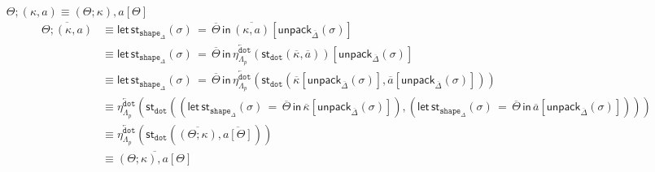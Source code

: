\documentclass[10pt]{article}
\theoremstyle{definition}
\newcommand{\rewrite}[2]{\overleftarrow{#1}(#2)}
\newcommand\StI[2]{\ensuremath{\mathsf{st}_{#1}(#2)}}
\newcommand\StE[4]{\ensuremath{\mathsf{let} \, \StI{#1}{#3} \, = \, {#2} \, \mathsf{in} \, #4}}
\newcommand\unpack[2]{\ensuremath{\mathsf{unpack}_{#1}(#2)}}
\newcommand{\modeof}[1]{{#1}_p}
\newcommand{\tdot}{\ensuremath{\mathtt{dot}}}
\newcommand{\tshape}[1]{\ensuremath{\mathtt{shape}_{#1}}}
\newcommand{\upstairs}[1]{\overline{#1}}
\begin{document}
\begin{enumerate}[style = multiline, labelwidth = 80pt]
\item[{$\Theta ; (\kappa , a) \equiv (\Theta ; \kappa) , a[\Theta]$}]
\begin{align*}
\upstairs{\Theta ; (\kappa , a)}
&\equiv \StE{\tshape{\Delta}}{\upstairs{\Theta}}{\sigma}{\upstairs{(\kappa , a)}[\unpack{\upstairs{\Delta}}{\sigma}]} \\
&\equiv \StE{\tshape{\Delta}}{\upstairs{\Theta}}{\sigma}{\rewrite{\eta^\tdot_{\modeof{\Lambda}}}{\StI{\tdot}{\upstairs{\kappa}, \upstairs{a}}}[\unpack{\upstairs{\Delta}}{\sigma}]} \\
&\equiv \StE{\tshape{\Delta}}{\upstairs{\Theta}}{\sigma}{\rewrite{\eta^\tdot_{\modeof{\Lambda}}}{\StI{\tdot}{\upstairs{\kappa}[\unpack{\upstairs{\Delta}}{\sigma}], \upstairs{a}[\unpack{\upstairs{\Delta}}{\sigma}]}}} \\
&\equiv \rewrite{\eta^\tdot_{\modeof{\Lambda}}}{\StI{\tdot}{(\StE{\tshape{\Delta}}{\upstairs{\Theta}}{\sigma}{\upstairs{\kappa}[\unpack{\upstairs{\Delta}}{\sigma}]}), (\StE{\tshape{\Delta}}{\upstairs{\Theta}}{\sigma}{\upstairs{a}[\unpack{\upstairs{\Delta}}{\sigma}]})}} \\
&\equiv \rewrite{\eta^\tdot_{\modeof{\Lambda}}}{\StI{\tdot}{\upstairs{(\Theta ; \kappa)}, \upstairs{a[\Theta]}}} \\
&\equiv \upstairs{(\Theta ; \kappa) , a[\Theta]}
\end{align*} 


\end{enumerate}
\end{document}
